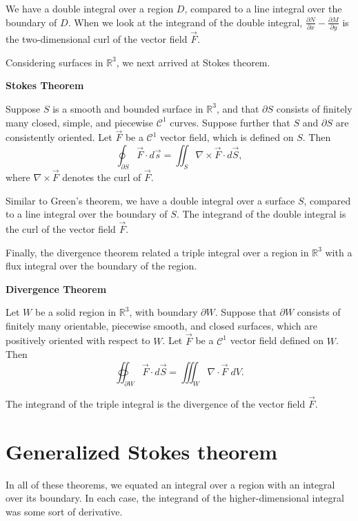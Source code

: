 \documentclass{ximera}
\begin{document}
We have a double integral over a region $D$, compared to a line integral over the boundary of $D$. When we look at the integrand of the double integral, $\frac{\partial N}{\partial x} - \frac{\partial M}{\partial y}$ is the two-dimensional curl of the vector field $\vec{F}$.

Considering surfaces in $\mathbb{R}^3$, we next arrived at Stokes theorem.

\begin{theorem}
\textbf{Stokes Theorem}

Suppose $S$ is a smooth and bounded surface in $\mathbb{R}^3$, and that $\partial S$ consists of finitely many closed, simple, and piecewise $\mathcal{C}^1$ curves. Suppose further that $S$ and $\partial S$ are consistently oriented. Let $\vec{F}$ be a $\mathcal{C}^1$ vector field, which is defined on $S$. Then
\[
\oint_{\partial S}\vec{F}\cdot d\vec{s} = \iint_S \nabla\times \vec{F}\cdot d\vec{S},
\]
where $\nabla\times \vec{F}$ denotes the curl of $\vec{F}$.
\end{theorem}

Similar to Green's theorem, we have a double integral over a surface $S$, compared to a line integral over the boundary of $S$. The integrand of the double integral is the curl of the vector field $\vec{F}$.

Finally, the divergence theorem related a triple integral over a region in $\mathbb{R}^3$ with a flux integral over the boundary of the region.

\begin{theorem}
\textbf{Divergence Theorem}

Let $W$ be a solid region in $\mathbb{R}^3$, with boundary $\partial W$. Suppose that $\partial W$ consists of finitely many orientable, piecewise smooth, and closed surfaces, which are positively oriented with respect to $W$. Let $\vec{F}$ be a $\mathcal{C}^1$ vector field defined on $W$. Then
\[
\oiint_{\partial W} \vec{F}\cdot d\vec{S} = \iiint_W \nabla\cdot \vec{F}\;dV.
\]
\end{theorem}

The integrand of the triple integral is the divergence of the vector field $\vec{F}$.

\section*{Generalized Stokes theorem}

In all of these theorems, we equated an integral over a region with an integral over its boundary. In each case, the integrand of the higher-dimensional integral was some sort of derivative.
\end{document}

